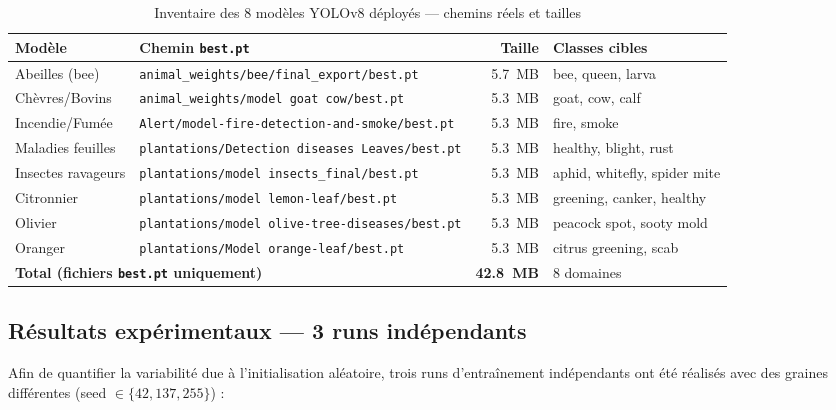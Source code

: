 \begin{table}[H]
\caption{Inventaire des 8 modèles YOLOv8 déployés — chemins réels et tailles}
\label{tab:yolo_models}
\centering
\small
\begin{tabularx}{\textwidth}{@{}l X r l@{}}
\toprule
\textbf{Modèle} & \textbf{Chemin \texttt{best.pt}} & \textbf{Taille} & \textbf{Classes cibles} \\
\midrule
Abeilles (bee)       & \texttt{animal\_weights/bee/final\_export/best.pt}              & 5.7~MB & bee, queen, larva \\
Chèvres/Bovins       & \texttt{animal\_weights/model goat cow/best.pt}                & 5.3~MB & goat, cow, calf \\
Incendie/Fumée       & \texttt{Alert/model-fire-detection-and-smoke/best.pt}          & 5.3~MB & fire, smoke \\
Maladies feuilles    & \texttt{plantations/Detection diseases Leaves/best.pt}         & 5.3~MB & healthy, blight, rust \\
Insectes ravageurs   & \texttt{plantations/model insects\_final/best.pt}              & 5.3~MB & aphid, whitefly, spider mite \\
Citronnier           & \texttt{plantations/model lemon-leaf/best.pt}                  & 5.3~MB & greening, canker, healthy \\
Olivier              & \texttt{plantations/model olive-tree-diseases/best.pt}         & 5.3~MB & peacock spot, sooty mold \\
Oranger              & \texttt{plantations/Model orange-leaf/best.pt}                 & 5.3~MB & citrus greening, scab \\
\midrule
\multicolumn{2}{l}{\textbf{Total (fichiers \texttt{best.pt} uniquement)}} & \textbf{42.8~MB} & 8 domaines \\
\bottomrule
\end{tabularx}
\end{table}

\subsection{Résultats expérimentaux — 3 runs indépendants}

Afin de quantifier la variabilité due à l'initialisation aléatoire,
trois runs d'entraînement indépendants ont été réalisés avec des graines
différentes (seed $\in \{42, 137, 255\}$) :

